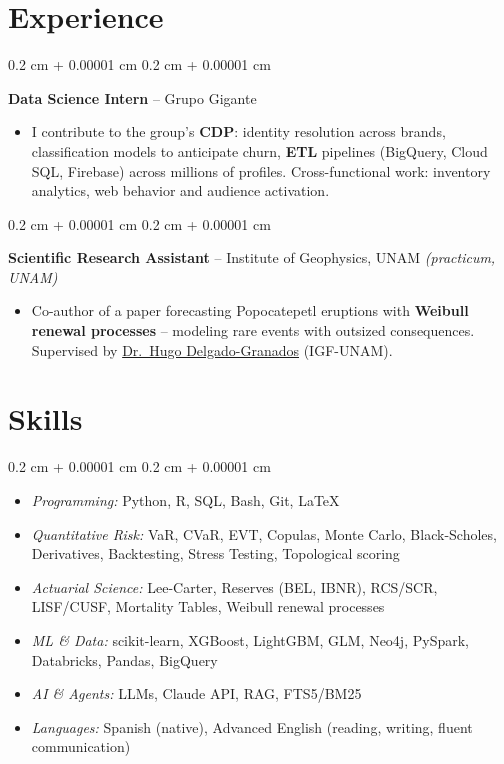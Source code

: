\documentclass[10pt, letterpaper]{article}
\newenvironment{highlights}{
    \begin{itemize}[
        topsep=0.05 cm,
        parsep=0.05 cm,
        partopsep=0pt,
        itemsep=0pt,
        leftmargin=0.4 cm + 10pt
    ]
}{
    \end{itemize}
}
\newenvironment{highlightsforbulletentries}{
    \begin{itemize}[
        topsep=0.02 cm,
        parsep=0.05 cm,
        partopsep=0pt,
        itemsep=0pt,
        leftmargin=10pt
    ]
}{
    \end{itemize}
}
\newenvironment{onecolentry}{
    \begin{adjustwidth}{
        0.2 cm + 0.00001 cm
    }{
        0.2 cm + 0.00001 cm
    }
}{
    \end{adjustwidth}
}
\let\hrefWithoutArrow\href
\renewcommand{\href}[2]{\hrefWithoutArrow{#1}{\ifthenelse{\equal{#2}{}}{ }{#2 }\raisebox{.15ex}{\footnotesize \faExternalLink*}}}
\begin{document}
    \section{Experience}

        \begin{onecolentry}
            \textbf{Data Science Intern} -- Grupo Gigante
            \begin{highlights}
                \item I contribute to the group's \textbf{CDP}: identity resolution across brands, classification models to anticipate churn, \textbf{ETL} pipelines (BigQuery, Cloud SQL, Firebase) across millions of profiles. Cross-functional work: inventory analytics, web behavior and audience activation.
            \end{highlights}
            \end{onecolentry}

        \vspace{0.02 cm}

        \begin{onecolentry}
            \textbf{Scientific Research Assistant} -- Institute of Geophysics, UNAM \textit{(practicum, UNAM)}
            \begin{highlights}
                \item Co-author of a paper forecasting Popocatepetl eruptions with \textbf{Weibull renewal processes} -- modeling rare events with outsized consequences. Supervised by \hrefWithoutArrow{https://scholar.google.com/citations?user=lDD0DZQAAAAJ}{Dr.\ Hugo Delgado-Granados} (IGF-UNAM).
            \end{highlights}
            \end{onecolentry}


    \section{Skills}

\begin{onecolentry}
    \begin{highlightsforbulletentries}
        \item \textit{Programming:} Python, R, SQL, Bash, Git, \LaTeX
        \item \textit{Quantitative Risk:} VaR, CVaR, EVT, Copulas, Monte Carlo, Black-Scholes, Derivatives, Backtesting, Stress Testing, Topological scoring
        \item \textit{Actuarial Science:} Lee-Carter, Reserves (BEL, IBNR), RCS/SCR, LISF/CUSF, Mortality Tables, Weibull renewal processes
        \item \textit{ML \& Data:} scikit-learn, XGBoost, LightGBM, GLM, Neo4j, PySpark, Databricks, Pandas, BigQuery
        \item \textit{AI \& Agents:} LLMs, Claude API, RAG, FTS5/BM25
        \item \textit{Languages:} Spanish (native), Advanced English (reading, writing, fluent communication)
    \end{highlightsforbulletentries}
\end{onecolentry}
\end{document}
